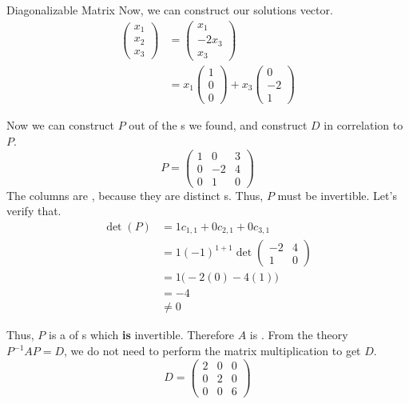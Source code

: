 \begin{example}{Diagonalizable Matrix}
  Now, we can construct our solutions vector.
  \begin{align*}
    \begin{pmatrix}
      x_{1} \\ x_{2} \\ x_{3}
    \end{pmatrix} &=
                    \begin{pmatrix}
                      x_{1} \\ -2x_{3} \\ x_{3}
                    \end{pmatrix} \\
    &= x_{1}
      \begin{pmatrix}
        1 \\ 0 \\ 0
      \end{pmatrix} + x_{3}
    \begin{pmatrix}
      0 \\ -2 \\ 1
    \end{pmatrix}
  \end{align*}

  Now we can construct $P$ out of the s we found, and construct $D$ in correlation to $P$.
  \begin{equation*}
    P =
    \begin{pmatrix}
      1 & 0 & 3 \\
      0 & -2 & 4 \\
      0 & 1 & 0
    \end{pmatrix}
  \end{equation*}
  The columns are , because they are distinct s.
  Thus, $P$ must be invertible.
  Let's verify that.
  \begin{align*}
    \det(P) &= 1 c_{1,1} + 0 c_{2,1} + 0 c_{3,1} \\
    &= 1 {(-1)}^{1+1} \det
      \begin{pmatrix}
        -2 & 4 \\
        1 & 0
      \end{pmatrix} \\
            &= 1 \bigl( -2 (0) - 4 (1) \bigr) \\
            &= -4 \\
            &\neq 0
  \end{align*}

  Thus, $P$ is a  of s which \textbf{is} invertible.
  Therefore $A$ is .
  From the theory $P^{-1}AP=D$, we do not need to perform the matrix multiplication to get $D$.
  \begin{equation*}
    D =
    \begin{pmatrix}
      2 & 0 & 0 \\
      0 & 2 & 0 \\
      0 & 0 & 6
    \end{pmatrix}
  \end{equation*}
\end{example}

